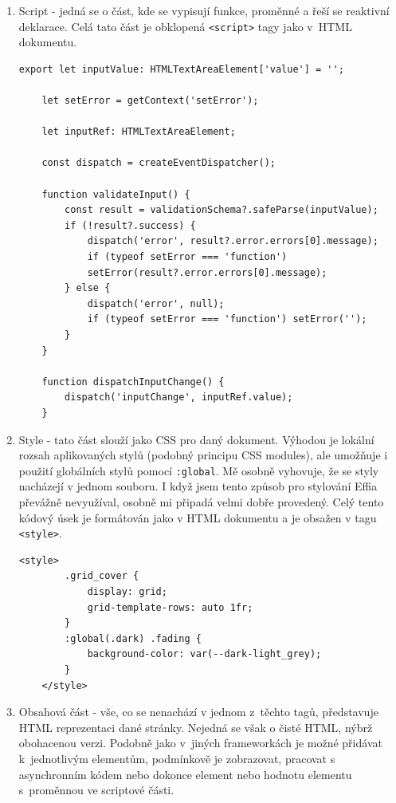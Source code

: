 \documentclass[12pt, a4paper,
openright
]{report}
\begin{document}
\begin{enumerate}
	\item Script - jedná se o část, kde se vypisují funkce, proměnné a řeší se reaktivní deklarace. Celá tato část je obklopená \texttt{<script>} tagy jako v~HTML dokumentu.
	\begin{lstlisting}[style=ES6, caption=Ukázka Svelte kódu ve script tagu, label=svelte-script-sample]
	export let inputValue: HTMLTextAreaElement['value'] = '';
	
	let setError = getContext('setError');
	
	let inputRef: HTMLTextAreaElement;
	
	const dispatch = createEventDispatcher();
	
	function validateInput() {
		const result = validationSchema?.safeParse(inputValue);
		if (!result?.success) {
			dispatch('error', result?.error.errors[0].message);
			if (typeof setError === 'function')
			setError(result?.error.errors[0].message);
		} else {
			dispatch('error', null);
			if (typeof setError === 'function') setError('');
		}
	}
	
	function dispatchInputChange() {
		dispatch('inputChange', inputRef.value);
	}
	\end{lstlisting}
	\item Style - tato část slouží jako CSS pro daný dokument. Výhodou je lokální rozsah aplikovaných stylů (podobný principu CSS modules), ale umožňuje i použití globálních stylů pomocí \texttt{:global}. Mě osobně vyhovuje, že se styly nacházejí v jednom souboru. I když jsem tento způsob pro stylování Effia převážně nevyužíval, osobně mi připadá velmi dobře provedený. Celý tento kódový úsek je formátován jako v HTML dokumentu a je obsažen v tagu \texttt{<style>}.
	
	\begin{lstlisting}[style=ES6, caption=Ukázka Svelte CSS kódu, label=svelte-CSS-sample]
	<style>
		.grid_cover {
			display: grid;
			grid-template-rows: auto 1fr;
		}
		:global(.dark) .fading {
			background-color: var(--dark-light_grey);
		}
	</style>
	\end{lstlisting}
	\item Obsahová část - vše, co se nenachází v jednom z~těchto tagů, představuje HTML reprezentaci dané stránky. Nejedná se však o čisté HTML, nýbrž obohacenou verzi. Podobně jako v~jiných frameworkách je možné přidávat  k~jednotlivým elementům, podmínkově je zobrazovat, pracovat s asynchronním kódem nebo dokonce  element nebo hodnotu elementu s~proměnnou ve scriptové části.
	

\end{enumerate}
\end{document}
